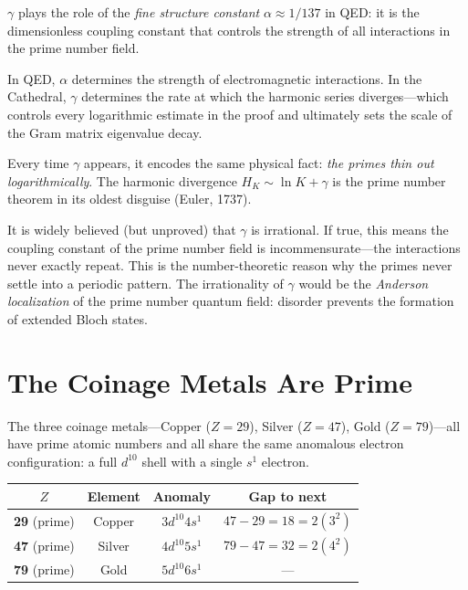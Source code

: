 \documentclass[11pt,a4paper]{article}
\begin{document}
\begin{principle}
$\gamma$ plays the role of the \emph{fine structure constant}
$\alpha \approx 1/137$ in QED: it is the dimensionless coupling
constant that controls the strength of all interactions in the
prime number field.

In QED, $\alpha$ determines the strength of electromagnetic
interactions. In the Cathedral, $\gamma$ determines the rate at
which the harmonic series diverges---which controls every
logarithmic estimate in the proof and ultimately sets the scale of
the Gram matrix eigenvalue decay.

Every time $\gamma$ appears, it encodes the same physical fact:
\emph{the primes thin out logarithmically}. The harmonic divergence
$H_K \sim \ln K + \gamma$ is the prime number theorem in its oldest
disguise (Euler, 1737).
\end{principle}

\begin{conjecture}
It is widely believed (but unproved) that $\gamma$ is irrational.
If true, this means the coupling constant of the prime number field
is incommensurate---the interactions never exactly repeat. This is
the number-theoretic reason why the primes never settle into a
periodic pattern. The irrationality of $\gamma$ would be the
\emph{Anderson localization} of the prime number quantum field:
disorder prevents the formation of extended Bloch states.
\end{conjecture}

\section{The Coinage Metals Are Prime}
\label{sec:coinage}

The three coinage metals---Copper ($Z = 29$), Silver ($Z = 47$),
Gold ($Z = 79$)---all have prime atomic numbers and all share the
same anomalous electron configuration: a full $d^{10}$ shell with
a single $s^1$ electron.

\begin{center}
\begin{tabular}{@{}cccc@{}}
\toprule
$Z$ & Element & Anomaly & Gap to next \\
\midrule
\textbf{29} (prime) & Copper & $3d^{10}4s^1$ & $47 - 29 = 18 = 2(3^2)$ \\
\textbf{47} (prime) & Silver & $4d^{10}5s^1$ & $79 - 47 = 32 = 2(4^2)$ \\
\textbf{79} (prime) & Gold & $5d^{10}6s^1$ & --- \\
\bottomrule
\end{tabular}
\end{center}
\end{document}
